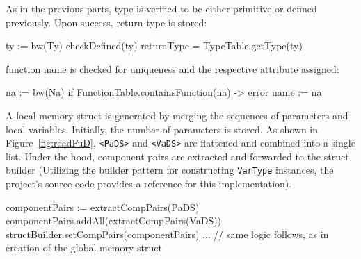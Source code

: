 \newpage
As in the previous parts, type is verified to be either primitive or defined previously. Upon success, return
type is stored:
\begin{codeblock}
ty := bw(Ty)
checkDefined(ty)
returnType = TypeTable.getType(ty)
\end{codeblock}
function name is checked for uniqueness and the respective attribute assigned:
\begin{codeblock}
na := bw(Na)
if FunctionTable.containsFunction(na) -> { error }
name := na
\end{codeblock}
A local memory struct is generated by merging the sequences of parameters and local variables.
Initially, the number of parameters is stored. As shown in Figure~\ref{fig:readFuD},
\verb+<PaDS>+ and \verb+<VaDS>+ are flattened and combined into a single list. Under the hood, component pairs
are extracted and forwarded to the struct builder (Utilizing the builder pattern for constructing \verb+VarType+ instances,
the project's source code provides a reference for this implementation).
\begin{codeblock}
componentPairs := extractCompPairs(PaDS)
componentPairs.addAll(extractCompPairs(VaDS))
structBuilder.setCompPairs(componentPairs)
... // same logic follows, as in creation of the global memory struct
\end{codeblock}
